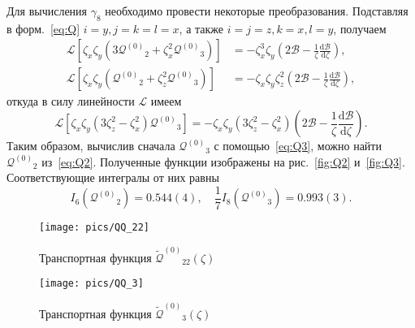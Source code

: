 \documentclass[a4paper,12pt]{article}
\newcommand{\dd}{\mathrm{d}}
\newcommand{\der}[2][]{\frac{\dd#1}{\dd#2}}
\newcommand{\Q}{\ensuremath{\mathcal{Q}^{(0)}}}
\newcommand{\QQ}{\ensuremath{\tilde{\mathcal{Q}}^{(0)}}}
\begin{document}
Для вычисления \(\gamma_8\) необходимо провести некоторые преобразования.
Подставляя в форм.~\eqref{eq:Q} \(i=y, j=k=l=x\), а также \(i=j=z, k=x, l=y\), получаем
\begin{align}
    \mathcal{L}\left[ \zeta_x\zeta_y \left( 3\Q_2+\zeta_x^2\Q_3 \right) \right]
        &= -\zeta_x^3\zeta_y\left(2\mathcal{B} - \frac1\zeta\der[\mathcal{B}]{\zeta}\right), \label{eq:Q2}\\
    \mathcal{L}\left[ \zeta_x\zeta_y \left( \Q_2+\zeta_z^2\Q_3 \right) \right]
        &= -\zeta_x\zeta_y\zeta_z^2\left(2\mathcal{B} - \frac1\zeta\der[\mathcal{B}]{\zeta}\right),
\end{align}
откуда в силу линейности \(\mathcal{L}\) имеем
\begin{equation}\label{eq:Q3}
    \mathcal{L}\left[ \zeta_x\zeta_y \left( 3\zeta_z^2-\zeta_x^2 \right)\Q_3 \right]
        = -\zeta_x\zeta_y\left( 3\zeta_z^2-\zeta_x^2 \right)\left(2\mathcal{B} - \frac1\zeta\der[\mathcal{B}]{\zeta}\right).
\end{equation}
Таким образом, вычислив сначала \(\Q_3\) с помощью~\eqref{eq:Q3}, можно найти \(\Q_2\) из~\eqref{eq:Q2}.
Полученные функции изображены на рис.~\ref{fig:Q2} и~\ref{fig:Q3}.
Соответствующие интегралы от них равны
\begin{equation}\label{eq:gamma8a}
    I_6\left(\Q_2\right) = 0.544(4), \quad \frac17 I_8\left(\Q_3\right) = 0.993(3).
\end{equation}

\begin{figure}
    \centering
    \begin{minipage}[b]{0.5\textwidth}
        \centering
        \texttt{[image: pics/QQ\_22]}
        \caption{Транспортная функция \(\QQ_{22}(\zeta)\)}
        \label{fig:QQ22}
    \end{minipage}%
    \begin{minipage}[b]{0.5\textwidth}
        \centering
        \texttt{[image: pics/QQ\_3]}
        \caption{Транспортная функция \(\QQ_3(\zeta)\)}
        \label{fig:QQ3}
    \end{minipage}
\end{figure}
\end{document}
